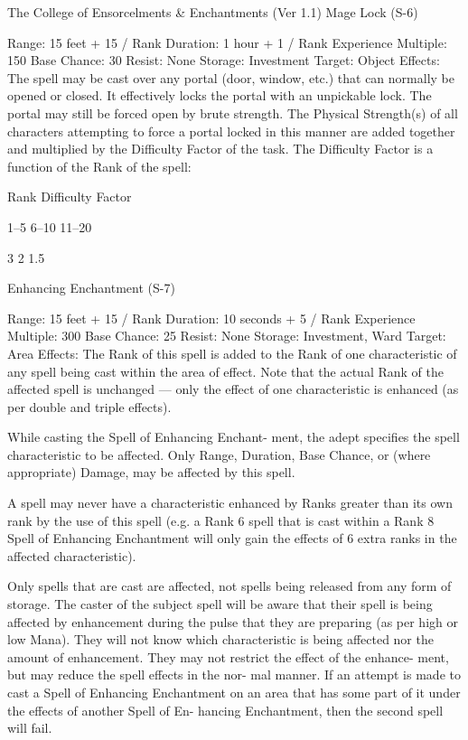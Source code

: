 \begin{Chapter}{The College of Ensorcelments \& Enchantments (Ver 1.1)}
Mage Lock (S-6) 

Range: 15 feet + 15 / Rank 
Duration: 1 hour + 1 / Rank 
Experience Multiple: 150 
Base Chance: 30%
Resist: None 
Storage: Investment 
Target: Object 
Effects:  The  spell  may  be  cast  over  any  portal 
(door,  window,  etc.)  that  can  normally  be  opened 
or  closed.  It  effectively  locks  the  portal  with  an 
unpickable  lock.  The  portal  may  still  be  forced 
open by brute strength. The Physical Strength(s) of 
all characters attempting to force a portal locked in 
this  manner  are  added  together  and  multiplied  by 
the  Difficulty  Factor  of  the  task.  The  Difficulty 
Factor is a function of the Rank of the spell: 

Rank  Difficulty Factor 

1–5 
6–10 
11–20 

3 
2 
1.5 

Enhancing Enchantment (S-7) 

Range: 15 feet + 15 / Rank 
Duration: 10 seconds + 5 / Rank 
Experience Multiple: 300 
Base Chance: 25%
Resist: None 
Storage: Investment, Ward 
Target: Area 
Effects: The Rank of this spell is added to the Rank 
of one characteristic of any spell being cast within 
the area of effect. Note that the actual Rank of the 
affected  spell  is  unchanged  —  only  the  effect  of 
one  characteristic  is  enhanced  (as  per  double  and 
triple effects). 

While  casting  the  Spell  of  Enhancing  Enchant-
ment, the adept specifies the spell characteristic to 
be  affected.  Only  Range,  Duration,  Base  Chance, 
or  (where  appropriate)  Damage,  may  be  affected 
by this spell. 

A  spell  may  never  have  a  characteristic  enhanced 
by  Ranks  greater  than  its  own  rank  by  the  use  of 
this  spell  (e.g.  a  Rank  6  spell  that  is  cast  within  a 
Rank 8 Spell of Enhancing Enchantment will only 
gain  the  effects  of  6  extra  ranks  in  the  affected 
characteristic). 

Only  spells  that  are  cast  are  affected,  not  spells 
being  released  from  any  form  of  storage.  The 
caster  of  the  subject  spell  will  be  aware  that  their 
spell  is  being  affected  by  enhancement  during  the 
pulse  that  they  are  preparing  (as  per  high  or  low 
Mana). They  will not know which characteristic is 
being  affected  nor  the  amount  of  enhancement. 
They  may  not  restrict  the  effect  of  the  enhance-
ment,  but  may  reduce  the  spell  effects  in  the  nor-
mal manner. If an attempt is made to cast a Spell of 
Enhancing  Enchantment  on  an  area  that  has  some 
part  of  it  under  the  effects  of  another  Spell  of  En-
hancing  Enchantment,  then  the  second  spell  will 
fail. 


\end{Chapter}
